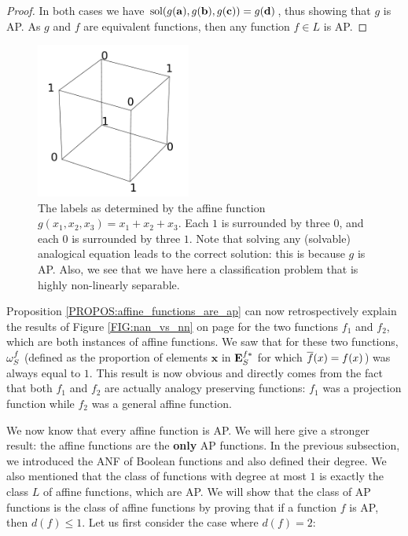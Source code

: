\begin{proof}
  In both cases we have $\text{sol}(g(\mathbf{a}), g(\mathbf{b}), g(\mathbf{c})) =
  g(\mathbf{d})$, thus showing that $g$ is AP.
  As $g$ and $f$ are equivalent functions, then any function $f \in L$ is AP.
\end{proof}

\begin{figure}[!h]
\centering
  \includegraphics[width=2in]{figures/affine_functions_neighbors.pdf}
  \caption{The labels as determined by the affine function $g(x_1, x_2, x_3) =
  x_1 + x_2 + x_3$. Each $1$ is surrounded by three $0$, and each $0$
  is surrounded by three $1$. Note that solving any (solvable) analogical
  equation leads to the correct solution: this is because $g$ is AP. Also, we
  see that we have here a classification problem that is highly non-linearly
  separable.}
  \label{FIG:affine_functions_neighbors}
\end{figure}

Proposition \ref{PROPOS:affine_functions_are_ap} can now retrospectively
explain the results of Figure \ref{FIG:nan_vs_nn} on page \pageref{FIG:nan_vs_nn}
for the two functions $f_1$ and $f_2$, which are both instances of affine
functions. We saw that for these two functions, $\omega_{S}^{f}$ (defined as the
proportion of elements $\mathbf{x}$ in $\mathbf{E}_{S}^{f*}$ for which $\overline{f}(x) = f(x)$) was
always equal to $1$. This result is now obvious and directly comes from the
fact that both $f_1$ and $f_2$ are actually analogy preserving functions: $f_1$
was a projection function while $f_2$ was a general affine function.

We now know that every affine function is AP. We will here give a stronger
result: the affine functions are the \textbf{only} AP functions.  In the
previous subsection, we introduced the ANF of Boolean functions and also
defined their degree. We also mentioned that the class of functions with degree
at most $1$ is exactly the class $L$ of affine functions, which are AP.  We
will show that the class of AP functions is the class of affine functions by
proving that if a function $f$ is AP, then $d(f)\leq 1$. Let us first consider
the case where $d(f) = 2$:

